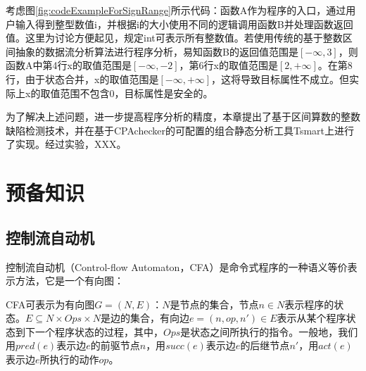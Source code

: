考虑图\ref{fig:codeExampleForSignRange}所示代码：函数A作为程序的入口，通过用户输入得到整型数值i，并根据i的大小使用不同的逻辑调用函数B并处理函数返回值。这里为讨论方便起见，规定int可表示所有整数值。若使用传统的基于整数区间抽象的数据流分析算法进行程序分析，易知函数B的返回值范围是$ [-\infty, 3] $，则函数A中第4行x的取值范围是$ [-\infty, -2] $，第6行x的取值范围是$ [2, +\infty] $。在第8行，由于状态合并，x的取值范围是$ [-\infty, +\infty] $，这将导致目标属性不成立。但实际上x的取值范围不包含0，目标属性是安全的。

为了解决上述问题，进一步提高程序分析的精度，本章提出了基于区间算数的整数缺陷检测技术，并在基于CPAchecker\cite{beyer2007configurable}的可配置的组合静态分析工具Tsmart上进行了实现。经过实验，XXX。

\section{预备知识}

%

\subsection{控制流自动机}

控制流自动机（Control-flow Automaton，CFA）是命令式程序的一种语义等价表示方法，它是一个有向图：
\begin{definition}
	CFA可表示为有向图$ G = (N, E) $：$ N $是节点的集合，节点$ n \in N $表示程序的状态。$ E \subseteq N \times Ops \times N $是边的集合，有向边$ e = (n, op, n') \in E $表示从某个程序状态到下一个程序状态的过程，其中，$ Ops $是状态之间所执行的指令。一般地，我们用$ pred(e) $表示边$ e $的前驱节点$ n $，用$ succ(e) $表示边$ e $的后继节点$ n' $，用$ act(e) $表示边$ e $所执行的动作$ op $。
\end{definition}

